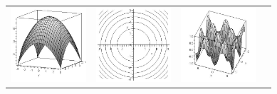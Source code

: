 \renewcommand{\mywidth}{1.1in}
\begin{center}
\begin{tabular}{cccc}
\includegraphics[width=\mywidth]{functions/functionseveral-1}&
\includegraphics[width=\mywidth]{functions/functionseveral-2}&
\includegraphics[width=\mywidth]{functions/functionseveral-3}&

\end{tabular}
\end{center}
